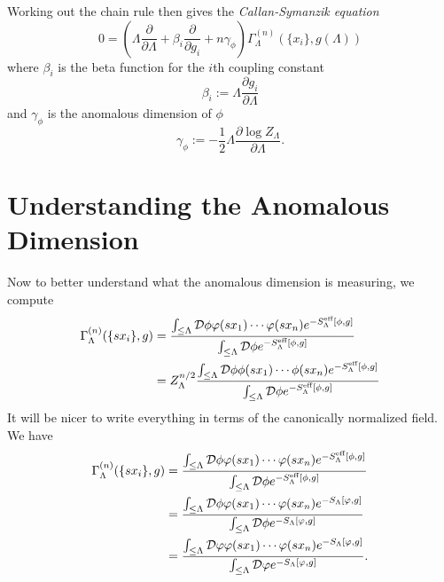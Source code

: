 \documentclass[11pt,letterpaper]{article}
\newcommand{\LP}{\left(}
\newcommand{\RP}{\right)}
\newcommand{\mc}[1]{\mathcal{#1}}
\newcommand{\PA}[2]{\frac{\partial #1}{\partial #2}}
\begin{document}
Working out the chain rule then gives the \textit{Callan-Symanzik equation} \begin{equation}
0 = \LP \Lambda \PA{}{\Lambda} + \beta_i \PA{}{g_i} + n \gamma_\phi \RP \Gamma_\Lambda^{(n)}( \{x_i\}, g(\Lambda))
\end{equation}
where $\beta_i$ is the beta function for the $i$th coupling constant \begin{equation}
\beta_i := \Lambda \PA{g_i}{\Lambda}
\end{equation}
and $\gamma_\phi$ is the anomalous dimension of $\phi$ \begin{equation}
\gamma_\phi := - \frac{1}{2} \Lambda \PA{\log Z_\Lambda}{\Lambda}.
\end{equation}


\section{Understanding the Anomalous Dimension}
Now to better understand what the anomalous dimension is measuring, we compute \begin{equation}
\begin{aligned}
\Gamma_\Lambda^{(n)} (\{s x_i\}, g) & = \frac{\int_{\leq \Lambda} \mc{D} \phi \varphi(sx_1) \cdots \varphi(sx_n) e^{- S_\Lambda^{\mbox{\tiny{eff}}}[\phi, g]}}{\int_{\leq \Lambda} \mc{D} \phi e^{- S_\Lambda^{\mbox{\tiny{eff}}}[\phi, g]}} \\
& = Z_\Lambda^{n/2} \frac{\int_{\leq \Lambda} \mc{D} \phi \phi(sx_1) \cdots \phi(sx_n) e^{- S_\Lambda^{\mbox{\tiny{eff}}}[\phi, g]}}{\int_{\leq \Lambda} \mc{D} \phi e^{- S_\Lambda^{\mbox{\tiny{eff}}}[\phi, g]}}
\end{aligned}
\end{equation}
It will be nicer to write everything in terms of the canonically normalized field. We have \begin{equation}
\begin{aligned}
\Gamma_\Lambda^{(n)} (\{s x_i\}, g) & = \frac{\int_{\leq \Lambda} \mc{D} \phi \varphi(sx_1) \cdots \varphi(sx_n) e^{- S_\Lambda^{\mbox{\tiny{eff}}}[\phi, g]}}{\int_{\leq \Lambda} \mc{D} \phi e^{- S_\Lambda^{\mbox{\tiny{eff}}}[\phi, g]}} \\
& = \frac{\int_{\leq \Lambda} \mc{D} \phi \varphi(sx_1) \cdots \varphi(sx_n) e^{- S_\Lambda[\varphi, g]}}{\int_{\leq \Lambda} \mc{D} \phi e^{- S_\Lambda[\varphi, g]}} \\
& = \frac{\int_{\leq \Lambda} \mc{D} \varphi \varphi(sx_1) \cdots \varphi(sx_n) e^{- S_\Lambda[\varphi, g]}}{\int_{\leq \Lambda} \mc{D} \varphi e^{- S_\Lambda[\varphi, g]}}.
\end{aligned}
\end{equation}
\end{document}
